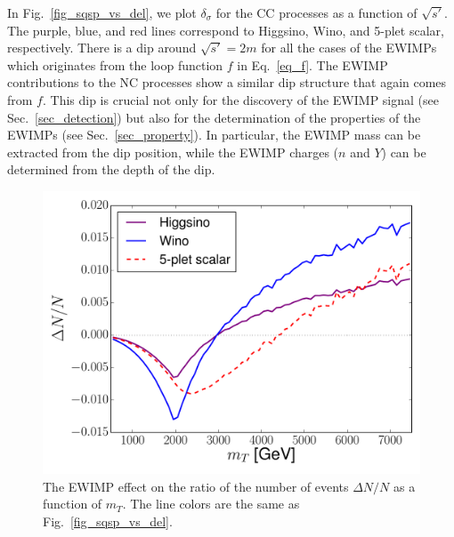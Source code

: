 \documentclass[12pt, a4paper]{article}
\begin{document}
In Fig.~\ref{fig_sqsp_vs_del}, we plot $\delta_\sigma$ for the CC
processes as a function of $\sqrt{s'}$.  The purple, blue, and red
lines correspond to Higgsino, Wino, and 5-plet scalar, respectively.
There is a dip around $\sqrt{s'} = 2m$ for all the cases of the EWIMPs
which originates from the loop function $f$ in Eq.~\eqref{eq_f}.  The
EWIMP contributions to the NC processes show a similar dip structure
that again comes from $f$.  This dip is crucial not only for the
discovery of the EWIMP signal (see Sec.~\ref{sec_detection}) but also
for the determination of the properties of the EWIMPs (see
Sec.~\ref{sec_property}).  In particular, the EWIMP mass can be
extracted from the dip position, while the EWIMP charges ($n$ and $Y$)
can be determined from the depth of the dip.

\begin{figure}[t]
 \centering
 \includegraphics[width=0.5\hsize]{mT_vs_del.pdf}
 \caption{The EWIMP effect on the ratio of the number of events $\Delta
   N / N$ as a function of $m_T$.  The line colors are the same as
   Fig.~\ref{fig_sqsp_vs_del}.}  \label{fig_mT_vs_dN}
\end{figure}
\end{document}
